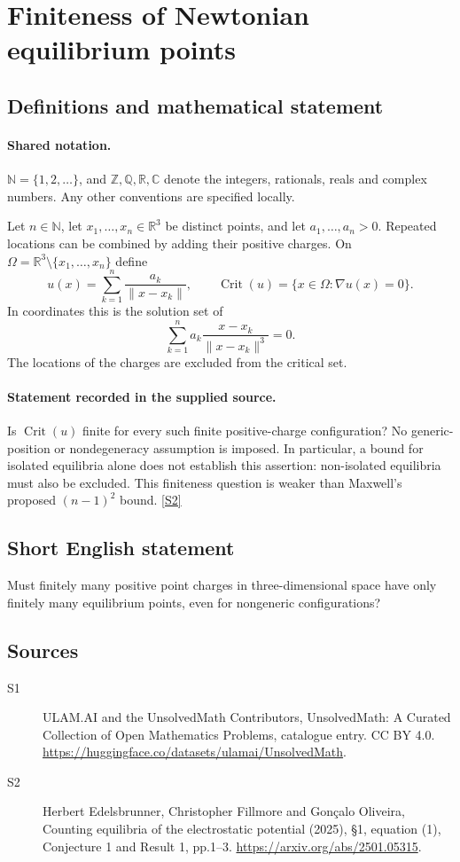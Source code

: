 \documentclass[11pt]{article}
\newcommand{\sref}[2]{\hyperlink{source:#1:#2}{[S#2]}}
\begin{document}
\section{Finiteness of Newtonian equilibrium points}\label{statement}

\subsection{Definitions and mathematical statement}

\paragraph{Shared notation.}$\mathbb N=\{1,2,\ldots\}$, and $\mathbb Z,\mathbb Q,\mathbb R,\mathbb C$ denote the integers, rationals, reals and complex numbers. Any other conventions are specified locally.


Let $n\in\mathbb N$, let $x_1,\ldots,x_n\in\mathbb R^3$ be distinct points, and let $a_1,\ldots,a_n>0$. Repeated locations can be combined by adding their positive charges. On $\Omega=\mathbb R^3\setminus\{x_1,\ldots,x_n\}$ define
\[
 u(x)=\sum_{k=1}^{n}\frac{a_k}{\lVert x-x_k\rVert},\qquad
 \operatorname{Crit}(u)=\{x\in\Omega:\nabla u(x)=0\}.
\]
In coordinates this is the solution set of
\[
 \sum_{k=1}^{n}a_k\frac{x-x_k}{\lVert x-x_k\rVert^3}=0.
\]
The locations of the charges are excluded from the critical set.
\paragraph{Statement recorded in the supplied source.}
Is $\operatorname{Crit}(u)$ finite for every such finite positive-charge configuration? No generic-position or nondegeneracy assumption is imposed. In particular, a bound for isolated equilibria alone does not establish this assertion: non-isolated equilibria must also be excluded. This finiteness question is weaker than Maxwell's proposed $(n-1)^2$ bound. \sref{statement}{2}
\subsection{Short English statement}
Must finitely many positive point charges in three-dimensional space have only finitely many equilibrium points, even for nongeneric configurations?
\subsection{Sources}
\begin{description}
\item[\hypertarget{source:statement:1}{S1}] ULAM.AI and the UnsolvedMath Contributors, UnsolvedMath: A Curated Collection of Open Mathematics Problems, catalogue entry. CC BY 4.0. \url{https://huggingface.co/datasets/ulamai/UnsolvedMath}.
\item[\hypertarget{source:statement:2}{S2}] Herbert Edelsbrunner, Christopher Fillmore and Gonçalo Oliveira, Counting equilibria of the electrostatic potential (2025), §1, equation (1), Conjecture 1 and Result 1, pp.1–3. \url{https://arxiv.org/abs/2501.05315}.
\end{description}
\label{end:statement}
\end{document}
